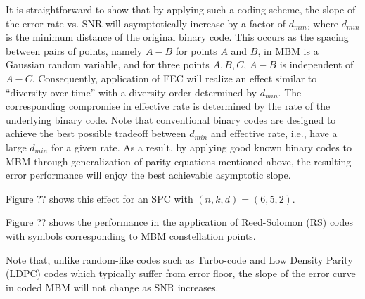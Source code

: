 It is straightforward to show that by applying such a coding scheme, the slope of the error rate vs. SNR will asymptotically increase by a factor of $d_{min}$, where $d_{min}$ is the minimum distance of the original binary code. This occurs as the spacing between pairs of points, namely $A-B$ for points $A$ and $B$, in MBM is a Gaussian random variable, and for three points $A,B,C$, $A-B$ is independent of $A-C$.
Consequently, application of FEC will realize an effect similar to ``diversity over time” with a diversity order determined by $d_{min}$. The corresponding compromise in effective rate is determined by the rate of the underlying binary
 code. Note that conventional binary codes are designed to achieve the best possible tradeoff between $d_{min}$ and effective rate, i.e., have a large $d_{min}$ for a given rate. As a result, by applying good known binary codes to MBM through generalization
 of parity equations mentioned above, the resulting error performance will enjoy the best achievable asymptotic slope.


Figure ?? shows this effect for an SPC with $(n,k,d)=(6,5,2)$.


Figure ?? shows the performance in the application of Reed-Solomon (RS) codes with symbols corresponding to MBM constellation points.


Note that, unlike random-like codes such as Turbo-code and Low Density Parity (LDPC) codes which typically suffer from error floor, the slope of the error curve in coded MBM will not change as SNR increases.



